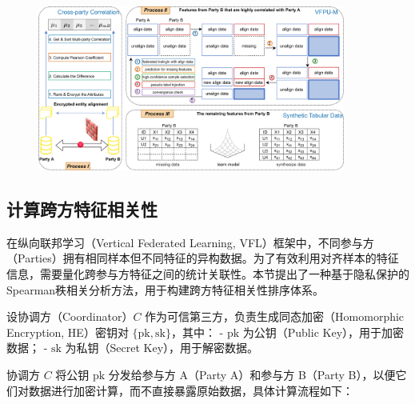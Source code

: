 \vspace{-0.1cm}
\begin{figure}[H]  %
	\centering     %
	\includegraphics[width=0.9\textwidth]{chapters/imgs/VFPU-M-Syn}  
	
	
	\label{fig:VFPU-M-Syn}  %
\end{figure}
\vspace{-0.35cm}

\subsection{计算跨方特征相关性}
在纵向联邦学习（Vertical Federated Learning, VFL）框架中，不同参与方（Parties）拥有相同样本但不同特征的异构数据。为了有效利用对齐样本的特征信息，需要量化跨参与方特征之间的统计关联性。本节提出了一种基于隐私保护的Spearman秩相关分析方法，用于构建跨方特征相关性排序体系。

设协调方（Coordinator）$ C $ 作为可信第三方，负责生成同态加密（Homomorphic Encryption, HE）密钥对 $ \{\text{pk}, \text{sk}\} $，其中：
- $ \text{pk} $ 为公钥（Public Key），用于加密数据；
- $ \text{sk} $ 为私钥（Secret Key），用于解密数据。

协调方 $ C $ 将公钥 $ \text{pk} $ 分发给参与方 A（Party A）和参与方 B（Party B），以便它们对数据进行加密计算，而不直接暴露原始数据，具体计算流程如下：

